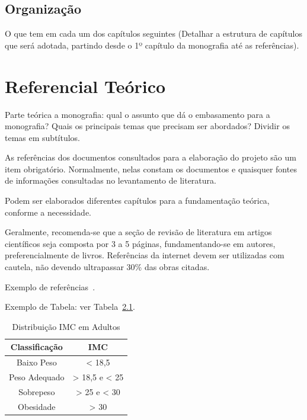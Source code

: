 \documentclass[
	12pt,				    %
	openright,			    %
	oneside,			    %
	a4paper,			    %
    sumario=tradicional,    %
	english,			    %
	brazil,				    %
	]{abntex2}
\begin{document}
\section{Organização}\label{sec:Organizacao}

O que tem em cada um dos capítulos seguintes (Detalhar a estrutura de capítulos que será adotada, partindo desde o 1º capítulo da monografia até as referências).

\chapter{Referencial Teórico}\label{sec:RefTeorico}\thispagestyle{empty}

Parte teórica a monografia: qual o assunto que dá o embasamento para a monografia? Quais os principais temas que precisam ser abordados? Dividir os temas em subtítulos. 

As referências dos documentos consultados para a elaboração do projeto são um item obrigatório. Normalmente, nelas constam os documentos e quaisquer fontes de informações consultadas no levantamento de literatura. 

Podem ser elaborados diferentes capítulos para a fundamentação teórica, conforme a necessidade.

Geralmente, recomenda-se que a seção de revisão de literatura em artigos científicos seja composta por 3 a 5 páginas, fundamentando-se em autores, preferencialmente de livros. Referências da internet devem ser utilizadas com cautela, não devendo ultrapassar 30\% das obras citadas.

Exemplo de refer\^encias~\cite{tese2019, confinter2019, confnac2019, site2019}.

Exemplo de Tabela: ver Tabela~\ref{tab:exetab}.

\begin{table}[!ht]
\begin{center}
\caption{Distribuição IMC em Adultos}
\label{tab:exetab}
\begin{tabular}{|c |c |}
\hline
\textbf{\textbf{Classificação}} & \textbf{IMC}\\
\hline\hline
Baixo Peso & < 18,5 \\
Peso Adequado & > 18,5 e < 25 \\
Sobrepeso & > 25 e < 30 \\
Obesidade & > 30 \\
\hline
\end{tabular}
\end{center}
\end{table}
\end{document}
